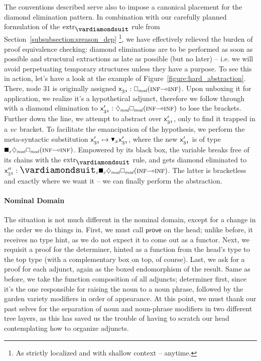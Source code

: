 The conventions described serve also to impose a canonical placement for the diamond elimination pattern.
In combination with our carefully planned formulation of the $\Extraction$ rule from Section~\ref{subsubsection:sreason_dep}%
	\footnote{As strictly localized and with shallow context -- anytime.},
we have effectively relieved the burden of proof equivalence checking: diamond eliminations are to be performed as soon as possible and structural extractions as late as possible (but no later) -- i.e. we will avoid perpetuating temporary structures unless they have a purpose.
To see this in action, let's have a look at the example of Figure~\ref{figure:hard_abstraction}.
There, node 31 is originally assigned $\Var{31} : \dbox{mod}(\infp[s]\li\infp[s])$.
Upon unboxing it for application, we realize it's a hypothetical adjunct, therefore we follow through with a diamond elimination to $\Var{31}' : \ddia{mod}\dbox{mod}(\infp[s]\li\infp[s])$ to lose the  brackets.
Further down the line, we attempt to abstract over $\mathsf{x}_{\mathnormal{31}}'$, only to find it trapped in a $\mathnormal{vc}$ bracket.
To facilitate the emancipation of the hypothesis, we perform the meta-syntactic substitution $\Var{31}' \mapsto \dboxelim{x}\Var{31}'$, where the new $\mathsf{x}_{\mathnormal{31}}'$ is of type $\dxbox{x}\ddia{mod}\dbox{mod}(\infp[s]\li\infp[s])$.
Empowered by its black box, the variable breaks free of its chains with the $\Extraction$ rule, and gets diamond eliminated to $\Var{31}'' : \dxdia{x}\dxbox{x}\ddia{mod}\dbox{mod}(\infp[s]\li\infp[s])$.
The latter is bracketless and exactly where we want it -- we can finally perform the abstraction.

\paragraph{Nominal Domain}
The situation is not much different in the nominal domain, except for a change in the order we do things in.
First, we must call $\mathsf{prove}$ on the head; unlike before, it receives no type hint, as we do not expect it to come out as a functor.
Next, we requisit a proof for the determiner, hinted as a function from the head's type to the top type (with a complementary box on top, of course).
Last, we ask for a proof for each adjunct, again as the boxed endomorphism of the result.
Same as before, we take the function composition of all adjuncts; determiner first, since it's the one responsible for raising the noun to a noun phrase, followed by the garden variety modifiers in order of appearance.
At this point, we must thank our past selves for the separation of noun and noun-phrase modifiers in two different tree layers, as this has saved us the trouble of having to scratch our head contemplating how to organize adjuncts.

